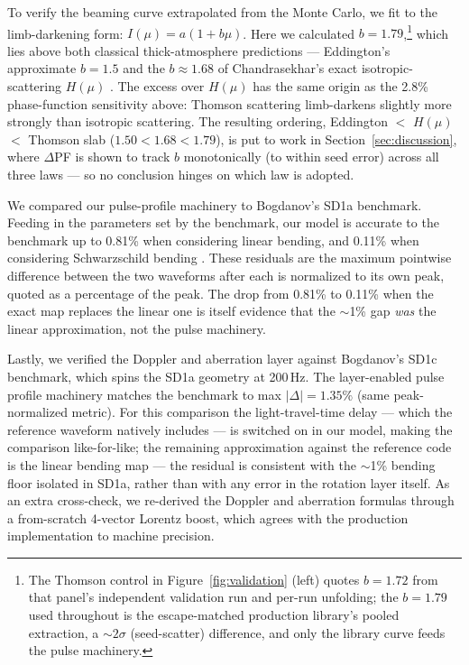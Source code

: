 \documentclass[twocolumn]{aastex701}
\begin{document}
To verify the beaming curve extrapolated from the Monte Carlo, we fit to the limb-darkening
form: $I(\mu) = a(1+b\mu)$. Here we calculated $b = 1.79$,\footnote{The Thomson control in
Figure~\ref{fig:validation} (left) quotes $b = 1.72$ from that panel's independent
validation run and per-run unfolding; the $b = 1.79$ used throughout is the escape-matched
production library's pooled extraction, a $\sim 2\sigma$ (seed-scatter) difference, and
only the library curve feeds the pulse machinery.} which lies above both classical
thick-atmosphere predictions --- Eddington's approximate $b = 1.5$ and the $b \approx 1.68$
of Chandrasekhar's exact isotropic-scattering $H(\mu)$
\citep{Chandrasekhar1960,Mihalas1978}. The excess over $H(\mu)$ has the same origin as the
2.8\% phase-function sensitivity above: Thomson scattering limb-darkens slightly more
strongly than isotropic scattering. The resulting ordering, Eddington $<$ $H(\mu)$ $<$
Thomson slab ($1.50 < 1.68 < 1.79$), is put to work in Section~\ref{sec:discussion}, where
$\Delta$PF is shown to track $b$ monotonically (to within seed error)
across all three laws --- so no conclusion
hinges on which law is adopted.

We compared our pulse-profile machinery to Bogdanov's SD1a benchmark. Feeding in the
parameters set by the benchmark, our model is accurate to the benchmark up to
0.81\% when
considering linear bending, and 0.11\% when considering Schwarzschild bending
\citep{Bogdanov2019,Pechenick1983}. These residuals are the maximum pointwise difference
between the two waveforms after each is normalized to its own peak, quoted as a percentage
of the peak. The drop from 0.81\% to 0.11\% when the exact map replaces
the linear one is
itself evidence that the $\sim$1\% gap \emph{was} the linear approximation, not the pulse
machinery.

Lastly, we verified the Doppler and aberration layer against Bogdanov's SD1c benchmark,
which spins the SD1a geometry at 200\,Hz. The layer-enabled pulse profile machinery matches
the benchmark to max $|\Delta| = 1.35\%$ (same peak-normalized metric).
For this comparison the light-travel-time delay --- which the reference
waveform natively includes --- is switched on in our model, making the comparison
like-for-like; the remaining approximation
against the reference code is the linear bending map --- the residual is consistent with the
$\sim$1\% bending floor isolated in SD1a, rather than with any error in the rotation layer
itself. {As an extra cross-check, we re-derived the Doppler and aberration formulas through
a from-scratch 4-vector Lorentz boost, which agrees with the production implementation to
machine precision.}
\end{document}
